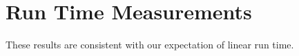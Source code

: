 \documentclass[draft,final]{vutinfth} %
\begin{document}
\section{Run Time Measurements}


These results are consistent with our expectation of linear run time.

    
        
        
\end{document}
